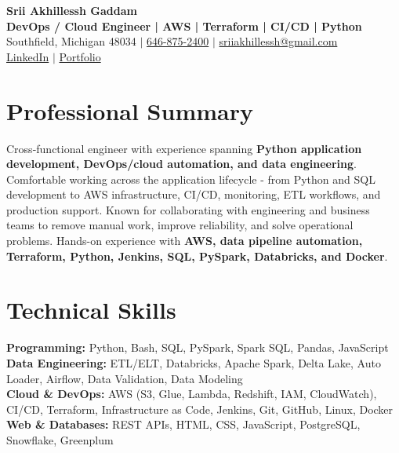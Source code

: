 \documentclass[letterpaper,10pt]{article}
\begin{document}
\fontsize{9.35pt}{10.45pt}\selectfont

\begin{center}
    {\LARGE \textbf{Srii Akhillessh Gaddam}} \\[-1pt]
    \textbf{DevOps / Cloud Engineer | AWS | Terraform | CI/CD | Python} \\[2pt]
    Southfield, Michigan 48034 $|$
    \href{tel:6468752400}{646-875-2400} $|$
    \href{mailto:sriiakhillessh@gmail.com}{sriiakhillessh@gmail.com} \\[1pt]
    \href{https://www.linkedin.com/in/srii-akhiilessh-gaddam-b48668191/}{LinkedIn} $|$
    \href{https://sriiakhillesshg.github.io/portfolio/}{Portfolio}
\end{center}
\vspace{-8pt}

\section{Professional Summary}
\small{Cross-functional engineer with experience spanning \textbf{Python application development, DevOps/cloud automation, and data engineering}. Comfortable working across the application lifecycle - from Python and SQL development to AWS infrastructure, CI/CD, monitoring, ETL workflows, and production support. Known for collaborating with engineering and business teams to remove manual work, improve reliability, and solve operational problems. Hands-on experience with \textbf{AWS, data pipeline automation, Terraform, Python, Jenkins, SQL, PySpark, Databricks, and Docker}.}

\section{Technical Skills}
\small{
\textbf{Programming:} Python, Bash, SQL, PySpark, Spark SQL, Pandas, JavaScript \\
\textbf{Data Engineering:} ETL/ELT, Databricks, Apache Spark, Delta Lake, Auto Loader, Airflow, Data Validation, Data Modeling \\
\textbf{Cloud \& DevOps:} AWS (S3, Glue, Lambda, Redshift, IAM, CloudWatch), CI/CD, Terraform, Infrastructure as Code, Jenkins, Git, GitHub, Linux, Docker \\
\textbf{Web \& Databases:} REST APIs, HTML, CSS, JavaScript, PostgreSQL, Snowflake, Greenplum
}
\end{document}
